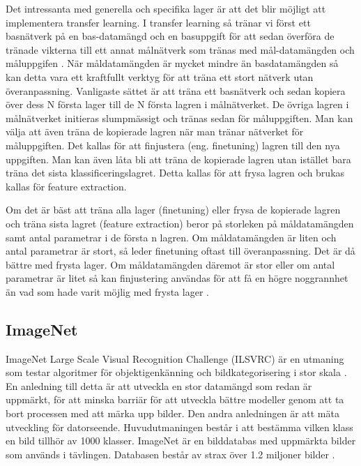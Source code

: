 \documentclass[]{kththesis}
\begin{document}
Det intressanta med generella och specifika lager är att det blir möjligt att implementera transfer learning. I transfer learning så tränar vi först ett basnätverk på en bas-datamängd och en basuppgift för att sedan överföra de tränade vikterna till ett annat målnätverk som tränas med mål-datamängden och måluppgifen \parencite{yosinski2014transferable}. När måldatamängden är mycket mindre än basdatamängden så kan detta vara ett kraftfullt verktyg för att träna ett stort nätverk utan överanpassning. Vanligaste sättet är att träna ett basnätverk och sedan kopiera över dess N första lager till de N första lagren i målnätverket. De övriga lagren i målnätverket initieras slumpmässigt och tränas sedan för måluppgiften. Man kan välja att även träna de kopierade lagren när man tränar nätverket för måluppgiften. Det kallas för att finjustera (eng. finetuning) lagren till den nya uppgiften. Man kan även låta bli att träna de kopierade lagren utan istället bara träna det sista klassificeringslagret. Detta kallas för att frysa lagren och brukas kallas för feature extraction.

Om det är bäst att träna alla lager (finetuning) eller frysa de kopierade lagren och träna sista lagret (feature extraction) beror på storleken på måldatamängden samt antal parametrar i de första n lagren. Om måldatamängden är liten och antal parametrar är stort, så leder finetuning oftast till överanpassning. Det är då bättre med frysta lager. Om måldatamängden däremot är stor eller om antal parametrar är litet så kan finjustering användas för att få en högre noggrannhet än vad som hade varit möjlig med frysta lager \parencite{yosinski2014transferable}. 

\subsection{ImageNet}
ImageNet Large Scale Visual Recognition Challenge (ILSVRC) är en utmaning som testar algoritmer för objektigenkänning och bildkategorisering i stor skala \parencite{ILSVRC15}. En anledning till detta är att utveckla en stor datamängd som redan är uppmärkt, för att minska barriär för att utveckla bättre modeller genom att ta bort processen med att märka upp bilder. Den andra anledningen är att mäta utveckling för datorseende. Huvudutmaningen består i att bestämma vilken klass en bild tillhör av 1000 klasser. ImageNet är en bilddatabas med uppmärkta bilder som används i tävlingen. Databasen består av strax över 1.2 miljoner bilder \parencite{huh2016makes}.
\end{document}
